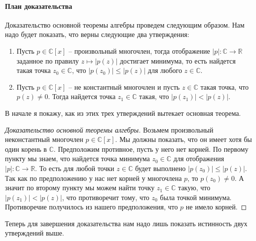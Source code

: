 \paragraph{План доказательства}

Доказательство основной теоремы алгебры проведем следующим образом.
Нам надо будет показать, что верны следующие два утверждения:
\begin{enumerate}
\item Пусть $p\in \mathbb C[x]$ -- произвольный многочлен, тогда отображение $|p|\colon \mathbb C\to \mathbb R$ заданное по правилу $z\mapsto |p(z)|$ достигает минимума, то есть найдется такая точка $z_0\in\mathbb C$, что $|p(z_0)|\leqslant |p(z)|$ для любого $z\in \mathbb C$.

\item Пусть $p\in \mathbb C[x]$ -- не константный многочлен и пусть $z\in \mathbb C$ такая точка, что $p(z) \neq 0$.
Тогда найдется точка $z_1\in \mathbb C$ такая, что $|p(z_1)| < |p(z)|$.
\end{enumerate}

В начале я покажу, как из этих трех утверждений вытекает основная теорема.

\begin{proof}
[Доказательство основной теоремы алгебры]
Возьмем произвольный неконстантный многочлен $p\in\mathbb C[x]$.
Мы должны показать, что он имеет хотя бы один корень в $\mathbb C$.
Предположим противное, пусть у него нет корней.
По первому пункту мы знаем, что найдется точка минимума $z_0\in\mathbb C$ для отображения $|p|\colon \mathbb C\to \mathbb R$.
То есть для любой точки $z\in\mathbb C$ будет выполнено $|p(z_0)|\leqslant |p(z)|$.
Так как по предположению у нас нет корней у многочлена $p$, то $p(z_0) \neq 0$.
А значит по второму пункту мы можем найти точку $z_1\in\mathbb C$ такую, что $|p(z_1)|< |p(z)|$, что противоречит тому, что $z_0$ была точкой минимума.
Противоречие получилось из нашего предположения, что $p$ не имело корней.
\end{proof}

Теперь для завершения доказательства нам надо лишь показать истинность двух утверждений выше.



